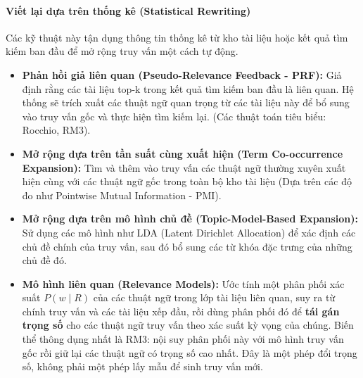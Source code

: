 \paragraph{Viết lại dựa trên thống kê (Statistical Rewriting)}
Các kỹ thuật này tận dụng thông tin thống kê từ kho tài liệu hoặc kết quả tìm kiếm ban đầu để mở rộng truy vấn một cách tự động.
\begin{itemize}
	\item \textbf{Phản hồi giả liên quan (Pseudo-Relevance Feedback - PRF):} Giả định rằng các tài liệu top-k trong kết quả tìm kiếm ban đầu là liên quan. Hệ thống sẽ trích xuất các thuật ngữ quan trọng từ các tài liệu này để bổ sung vào truy vấn gốc và thực hiện tìm kiếm lại. (Các thuật toán tiêu biểu: Rocchio, RM3).
	\item \textbf{Mở rộng dựa trên tần suất cùng xuất hiện (Term Co-occurrence Expansion):} Tìm và thêm vào truy vấn các thuật ngữ thường xuyên xuất hiện cùng với các thuật ngữ gốc trong toàn bộ kho tài liệu (Dựa trên các độ đo như Pointwise Mutual Information - PMI).
	\item \textbf{Mở rộng dựa trên mô hình chủ đề (Topic-Model-Based Expansion):} Sử dụng các mô hình như LDA (Latent Dirichlet Allocation) để xác định các chủ đề chính của truy vấn, sau đó bổ sung các từ khóa đặc trưng của những chủ đề đó.
	\item \textbf{Mô hình liên quan (Relevance Models):} \cite{lavrenko2001relevance} Ước tính một phân phối xác suất $P(w \mid R)$ của các thuật ngữ trong lớp tài liệu liên quan, suy ra từ chính truy vấn và các tài liệu xếp đầu, rồi dùng phân phối đó để \textbf{tái gán trọng số} cho các thuật ngữ truy vấn theo xác suất kỳ vọng của chúng. Biến thể thông dụng nhất là RM3: nội suy phân phối này với mô hình truy vấn gốc rồi giữ lại các thuật ngữ có trọng số cao nhất. Đây là một phép đổi trọng số, không phải một phép lấy mẫu để sinh truy vấn mới.
\end{itemize}

